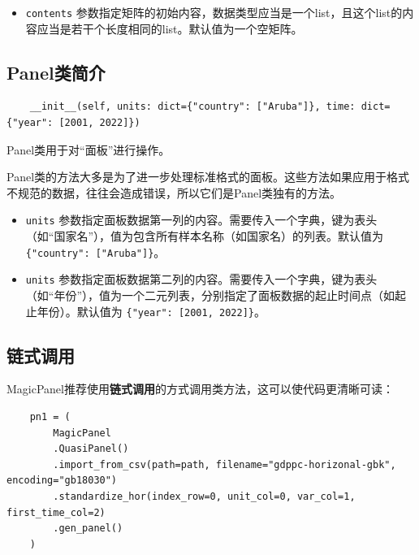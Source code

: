 \documentclass[a4paper, UTF8, fontset=none]{ctexart}
\begin{document}
    \begin{itemize}
        \item \verb|contents| 参数指定矩阵的初始内容，数据类型应当是一个list，且这个list的内容应当是若干个长度相同的list。默认值为一个空矩阵。
    \end{itemize}

\subsection{Panel类简介}

    \begin{lstlisting}
    __init__(self, units: dict={"country": ["Aruba"]}, time: dict={"year": [2001, 2022]})
    \end{lstlisting}

    Panel类用于对“面板”进行操作。

    Panel类的方法大多是为了进一步处理标准格式的面板。这些方法如果应用于格式不规范的数据，往往会造成错误，所以它们是Panel类独有的方法。

    \begin{itemize}
        \item \verb|units| 参数指定面板数据第一列的内容。需要传入一个字典，键为表头（如“国家名”），值为包含所有样本名称（如国家名）的列表。默认值为 \verb|{"country": ["Aruba"]}|。
        \item \verb|units| 参数指定面板数据第二列的内容。需要传入一个字典，键为表头（如“年份”），值为一个二元列表，分别指定了面板数据的起止时间点（如起止年份）。默认值为 \verb|{"year": [2001, 2022]}|。
    \end{itemize}



\subsection{链式调用}

    MagicPanel推荐使用\textbf{链式调用}的方式调用类方法，这可以使代码更清晰可读：

    \begin{lstlisting}
    pn1 = (
        MagicPanel
        .QuasiPanel()
        .import_from_csv(path=path, filename="gdppc-horizonal-gbk", encoding="gb18030")
        .standardize_hor(index_row=0, unit_col=0, var_col=1, first_time_col=2)
        .gen_panel()
    )
    \end{lstlisting}
    
\end{document}
